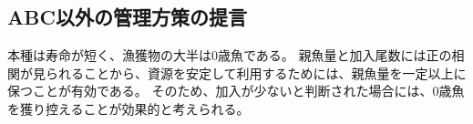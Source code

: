 \subsection{ABC以外の管理方策の提言}
本種は寿命が短く、漁獲物の大半は0歳魚である。
親魚量と加入尾数には正の相関が見られることから、資源を安定して利用するためには、親魚量を一定以上に保つことが有効である。
そのため、加入が少ないと判断された場合には、0歳魚を獲り控えることが効果的と考えられる。
